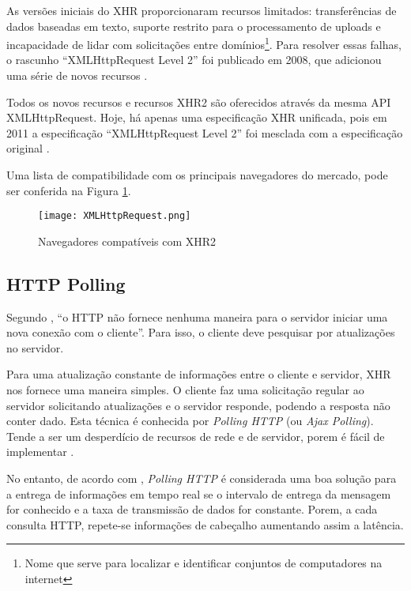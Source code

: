 \begin{citacao}
	As versões iniciais do XHR proporcionaram recursos limitados: transferências de dados baseadas em texto, suporte restrito para o processamento de uploads e incapacidade de lidar com solicitações entre domínios\footnote{Nome que serve para localizar e identificar conjuntos de computadores na internet}. Para resolver essas falhas, o rascunho “XMLHttpRequest Level 2” foi publicado em 2008, que adicionou uma série de novos recursos \cite[P.~262-263]{grigorik2013high}.
\end{citacao}

Todos os novos recursos e recursos XHR2 são oferecidos através da mesma API XMLHttpRequest. Hoje, há apenas uma especificação XHR unificada, pois em 2011 a especificação “XMLHttpRequest Level 2” foi mesclada com a especificação original \cite{grigorik2013high}.

Uma lista de compatibilidade com os principais navegadores do mercado, pode ser conferida na Figura \ref{fig:xhr2}.

\begin{figure}[!htb]
	\centering
	\texttt{[image: XMLHttpRequest.png]}
	\caption{Navegadores compatíveis com XHR2}
	\label{fig:xhr2}
\end{figure}

\subsection{HTTP Polling}

Segundo , “o HTTP não fornece nenhuma maneira para o servidor iniciar uma nova conexão com o cliente”. Para isso, o cliente deve pesquisar por atualizações no servidor.

Para uma atualização constante de informações entre o cliente e servidor, XHR nos fornece uma maneira simples. O cliente faz uma solicitação regular ao servidor solicitando atualizações e o servidor responde, podendo a resposta não conter dado. Esta técnica é conhecida por \emph{Polling HTTP} (ou \emph{Ajax Polling}). Tende a ser um desperdício de recursos de rede e de servidor, porem é fácil de implementar \cite{mccarthy2009comet}.

No entanto, de acordo com , \emph{Polling HTTP} é considerada uma boa solução para a entrega de informações em tempo real se o intervalo de entrega da mensagem for conhecido e  a taxa de transmissão de dados for constante. Porem, a cada consulta HTTP, repete-se informações de cabeçalho aumentando assim a latência.

